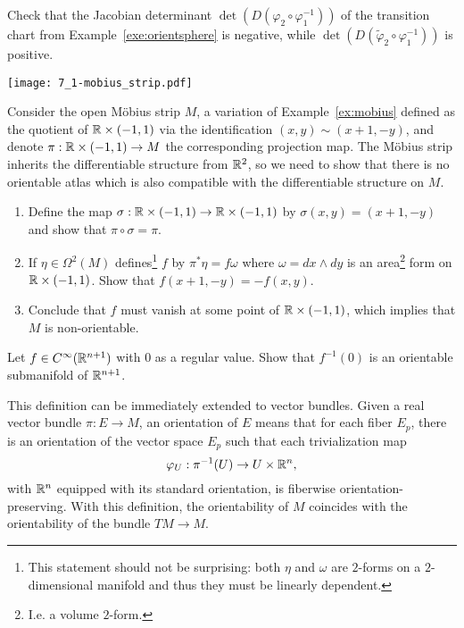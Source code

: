 \begin{exercise}
  Check that the Jacobian determinant $\det(D(\varphi_2\circ \varphi_1^{-1}))$ of the transition chart from Example~\ref{exe:orientsphere} is negative, while $\det(D(\widetilde\varphi_2\circ \varphi_1^{-1}))$ is positive.
\end{exercise}

\begin{marginfigure}
  \texttt{[image: 7\_1-mobius\_strip.pdf]}
\end{marginfigure}

\begin{exercise}
  Consider the open M\"obius strip $M$, a variation of Example~\ref{ex:mobius} defined as the quotient of $\mathbb{R}\times(-1,1)$ via the identification $(x,y) \sim (x+1, -y)$, and denote $\pi: \mathbb{R}\times(-1,1)\to M$ the corresponding projection map.
  The M\"obius strip inherits the differentiable structure from $\mathbb{R}^2$, so we need to show that there is no orientable atlas which is also compatible with the differentiable structure on $M$.
  \begin{enumerate}
    \item Define the map $\sigma:\mathbb{R}\times(-1,1)\to\mathbb{R}\times(-1,1)$ by $\sigma(x,y) = (x+1, -y)$ and show that $\pi\circ\sigma = \pi$.
    \item If $\eta\in\Omega^2(M)$ defines\footnote{This statement should not be surprising: both $\eta$ and $\omega$ are $2$-forms on a $2$-dimensional manifold and thus they must be linearly dependent.} $f$ by $\pi^* \eta = f \omega$ where $\omega = dx\wedge dy$ is an area\footnote{I.e. a volume $2$-form.} form on $\mathbb{R}\times(-1,1)$.
          Show that $f(x+1, -y) = - f(x,y)$.
    \item Conclude that $f$ must vanish at some point of $\mathbb{R}\times(-1,1)$, which implies that $M$ is non-orientable.
  \end{enumerate}
\end{exercise}

\begin{exercise}
  Let $f\in C^\infty(\mathbb{R}^{n+1})$ with $0$ as a regular value.
  Show that $f^{-1}(0)$ is an orientable submanifold of $\mathbb{R}^{n+1}$.
\end{exercise}

\begin{remark}
  This definition can be immediately extended to vector bundles.
  Given a real vector bundle $\pi: E \to M$, an orientation of $E$ means that for each fiber $E_p$, there is an orientation of the vector space $E_p$ such that each trivialization map
  \begin{equation}
    \varphi_{U}:\pi^{-1}(U)\to U\times \mathbb{R}^{n},
  \end{equation}
  with $\mathbb{R}^n$ equipped with its standard orientation, is fiberwise orientation-preserving.
  With this definition, the orientability of $M$ coincides with the orientability of the bundle $TM\to M$.
\end{remark}

